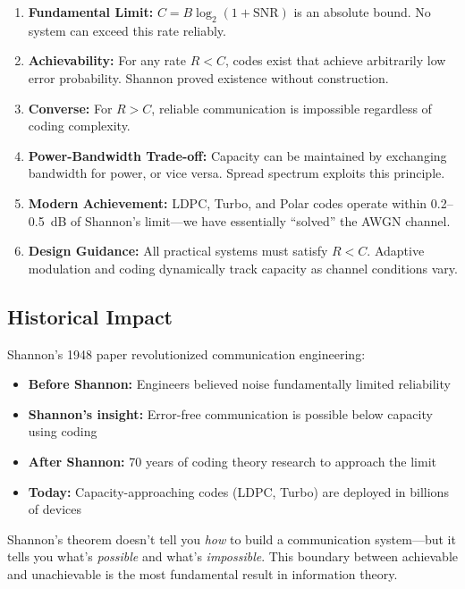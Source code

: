 \begin{enumerate}
\item \textbf{Fundamental Limit:} $C = B \log_2(1 + \mathrm{SNR})$ is an absolute bound. No system can exceed this rate reliably.

\item \textbf{Achievability:} For any rate $R < C$, codes exist that achieve arbitrarily low error probability. Shannon proved existence without construction.

\item \textbf{Converse:} For $R > C$, reliable communication is impossible regardless of coding complexity.

\item \textbf{Power-Bandwidth Trade-off:} Capacity can be maintained by exchanging bandwidth for power, or vice versa. Spread spectrum exploits this principle.

\item \textbf{Modern Achievement:} LDPC, Turbo, and Polar codes operate within 0.2--0.5~dB of Shannon's limit---we have essentially ``solved'' the AWGN channel.

\item \textbf{Design Guidance:} All practical systems must satisfy $R < C$. Adaptive modulation and coding dynamically track capacity as channel conditions vary.
\end{enumerate}

\subsection{Historical Impact}

Shannon's 1948 paper revolutionized communication engineering:
\begin{itemize}
\item \textbf{Before Shannon:} Engineers believed noise fundamentally limited reliability
\item \textbf{Shannon's insight:} Error-free communication is possible below capacity using coding
\item \textbf{After Shannon:} 70 years of coding theory research to approach the limit
\item \textbf{Today:} Capacity-approaching codes (LDPC, Turbo) are deployed in billions of devices
\end{itemize}

\begin{keyconcept}
Shannon's theorem doesn't tell you \textit{how} to build a communication system---but it tells you what's \textit{possible} and what's \textit{impossible}. This boundary between achievable and unachievable is the most fundamental result in information theory.
\end{keyconcept}

